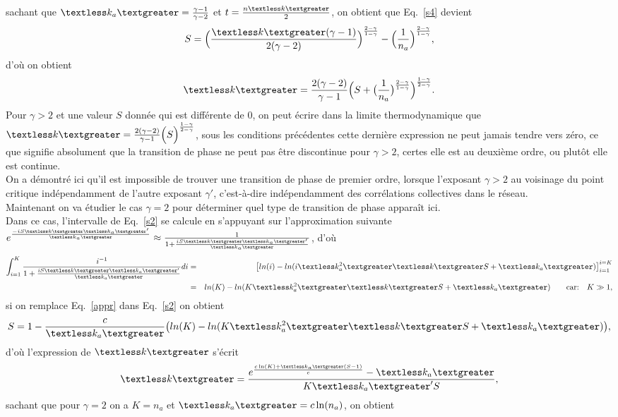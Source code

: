  sachant que $\kma=\frac{\gamma-1}{\gamma-2}$ et $t=\frac{n\km}{2}$, on obtient que Eq.~\eqref{s4} devient
  \begin{equation}
  S=\Big(\frac{\km (\gamma-1)}{2(\gamma-2)}\Big)^{\frac{2-\gamma}{1-\gamma}}-\Big(\frac{1}{n_a}\Big)^{\frac{2-\gamma}{1-\gamma}},
  \label{s5}
  \end{equation}
  d'où on obtient 
    \begin{equation}
    \km=\frac{2(\gamma-2)}{\gamma-1}\Big(S+\big(\frac{1}{n_a}\big)^{\frac{2-\gamma}{1-\gamma}}\Big)^{\frac{1-\gamma}{2-\gamma}}.
    \end{equation}
  Pour $\gamma>2$ et une valeur $S$ donnée qui est différente de $0$, on peut écrire dans la limite thermodynamique que $ \km=\frac{2(\gamma-2)}{\gamma-1}\Big(S\Big)^{\frac{1-\gamma}{2-\gamma}}$, sous les conditions précédentes 
  cette dernière expression ne peut jamais tendre vers zéro, ce que signifie absolument que la transition de phase ne peut pas être discontinue pour $\gamma>2$, certes elle est au deuxième ordre, ou plutôt elle est continue.\\
  On a démontré ici qu'il est impossible de trouver une transition de phase de premier ordre, lorsque l'exposant $\gamma>2$ au voisinage du point critique indépendamment de l'autre exposant $\gamma'$, c'est-à-dire indépendamment des corrélations collectives dans le réseau.\\
  Maintenant on va étudier le cas $\gamma=2$ pour déterminer quel type de transition de phase apparaît ici.\\
   Dans ce cas, l'intervalle de Eq.~\eqref{s2} se calcule en s'appuyant sur l'approximation suivante  $e^{\frac{-iS\km\kma'}{\kma}}\approx \frac{1}{1+\frac{iS\km\kma'}{\kma}}$, d'où
  \begin{eqnarray}
  \int_{i=1}^K\frac{i^{-1}}{1+\frac{iS\km\kma'}{\kma}}di&=&\big[ln(i)-ln(i\kmaa\km S+\kma)\big]_{i=1}^{i=K}\nonumber\\
  &=&ln(K)-ln(K\kmaa\km S+\kma)  \quad \quad  \text{car:} \quad K\gg 1,
  \label{appr}
  \end{eqnarray}
  si on remplace Eq.~\eqref{appr} dans Eq.~\eqref{s2} on obtient 
  \begin{equation}
  S=1-\frac{c}{\kma}\big(ln(K)-ln(K\kmaa\km S+\kma)\big),
  \end{equation}
  d'où l'expression de $\km$ s'écrit
  \begin{equation}
 \km=\frac{e^{\frac{c\ln(K)+\kma(S-1)}{c}}-\kma}{K\kma' S},
  \end{equation}
 sachant que pour $\gamma=2$ on a $K=n_a$ et $\kma=c\ln(n_a)$, on obtient
